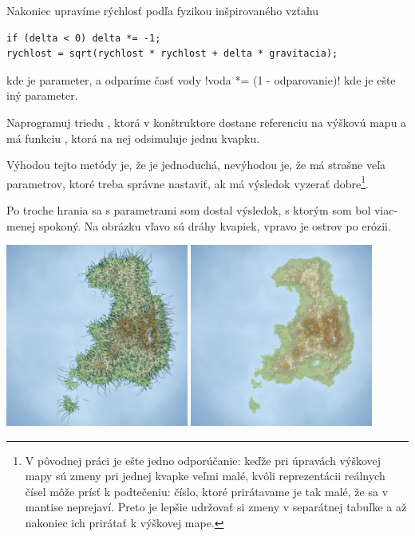 Nakoniec upravíme rýchlosť podľa fyzikou inšpirovaného vzťahu

\begin{lstlisting}
if (delta < 0) delta *= -1;
rychlost = sqrt(rychlost * rychlost + delta * gravitacia);
\end{lstlisting}

kde  je parameter, a odparíme časť vody 
\prg!voda *= (1 - odparovanie)! kde  je ešte iný parameter.

\begin{uloha}
  Naprogramuj triedu , ktorá v konštruktore dostane referenciu na 
  výškovú mapu a má funkciu , ktorá na nej odsimuluje jednu kvapku.
\end{uloha}

Výhodou tejto metódy je, že je jednoduchá, nevýhodou je, že má strašne veľa parametrov,
ktoré treba správne nastaviť, ak má výsledok vyzerať dobre\footnote{
  V pôvodnej práci je ešte jedno odporúčanie: keďže pri úpravách výškovej mapy sú zmeny
  pri jednej kvapke veľmi malé, kvôli reprezentácii reálnych čísel môže prísť
  k podtečeniu: číslo, ktoré prirátavame je tak malé, že sa v mantise neprejaví.
  Preto je lepšie udržovať
  si zmeny v separátnej tabuľke a až nakoniec ich prirátať k výškovej mape.}.


Po troche hrania sa s parametrami som dostal výsledok, s ktorým som bol viac-menej spokoný.
Na obrázku vľavo sú dráhy kvapiek, vpravo je ostrov po erózii.\\


\centerline{
  \includegraphics[width=0.45\textwidth]{data/86_rendered_droplets.png}
  \hfill
  \includegraphics[width=0.45\textwidth]{data/86_rendered.png}
}

